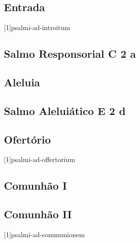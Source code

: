 
\subsection{Entrada}\label{subsection:tempus-nativitatis/sanctae-dei-genetricis-mariae/introitus}
[1]{psalmi-ad-introitum}

\AllowPageFlush

\subsection[Salmo Responsorial]{Salmo Responsorial \textmd{C 2 a}}\label{subsection:tempus-nativitatis/sanctae-dei-genetricis-mariae/psalmus-responsorius}

\AllowPageFlush

\subsection{Aleluia}\label{subsection:tempus-nativitatis/sanctae-dei-genetricis-mariae/alleluia}

\AllowPageFlush

\subsection[Salmo Aleluiático]{Salmo Aleluiático \textmd{E 2 d}}\label{subsection:tempus-nativitatis/sanctae-dei-genetricis-mariae/psalmus-alleluiaticus}

\AllowPageFlush

\subsection{Ofertório}\label{subsection:tempus-nativitatis/sanctae-dei-genetricis-mariae/offertorium}
[1]{psalmi-ad-offertorium}

\AllowPageFlush

\subsection{Comunhão I}\label{subsection:tempus-nativitatis/sanctae-dei-genetricis-mariae/communio-1}

\AllowPageFlush

\subsection{Comunhão II}\label{subsection:tempus-nativitatis/sanctae-dei-genetricis-mariae/communio-2}
[1]{psalmi-ad-communionem}